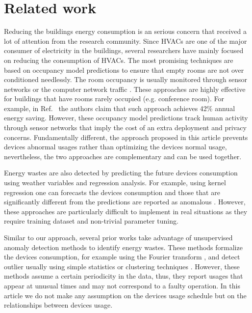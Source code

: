 \section{Related work}
Reducing the buildings energy consumption is an serious concern that received a lot of attention from the research community.
Since HVACs are one of the major consumer of electricity in the buildings, several researchers have mainly focused on reducing the consumption of HVACs.
The most promising techniques are based on occupancy model predictions to ensure that empty rooms are not over conditioned needlessly.
The room occupancy is usually monitored through sensor networks \cite{agarwal:ipsn2011,erickson:ipsn2011} or the computer network traffic \cite{kim:buildsys2010}.
These approaches are highly effective for buildings that have rooms rarely occupied (e.g. conference room).
For example, in Ref.~\cite{erickson:ipsn2011} the authors claim that such approach achieves 42\% annual energy saving.
However, these occupancy model predictions track human activity through sensor networks that imply the cost of an extra deployment and privacy concerns.
Fundamentally different, the approach proposed in this article prevents devices abnormal usages rather than optimizing the devices normal usage, nevertheless, the two approaches are complementary and can be used together.

Energy wastes are also detected by predicting the future devices consumption using weather variables and regression analysis.
For example, using kernel regression one can forecasts the devices consumption and those that are significantly different from the predictions are reported as anomalous \cite{brown:buildperf2012}.
However, these approaches are particularly difficult to implement in real situations as they require training dataset and non-trivial parameter tuning.

Similar to our approach, several prior works take advantage of unsupervised anomaly detection methods to identify energy wastes.
These methods formalize the devices consumption, for example using the Fourier transform \cite{Bellala_buildsys11,wrinch:pes2012}, and detect outlier usually using simple statistics \cite{li:ieee2010} or clustering techniques \cite{bellala:kdd2012,jakkula,chen:aaaiw2011}.
However, these methods assume a certain periodicity in the data, thus, they report usages that appear at unusual times and may not correspond to a faulty operation.
In this article we do not make any assumption on the devices usage schedule but on the relationships between devices usage.


